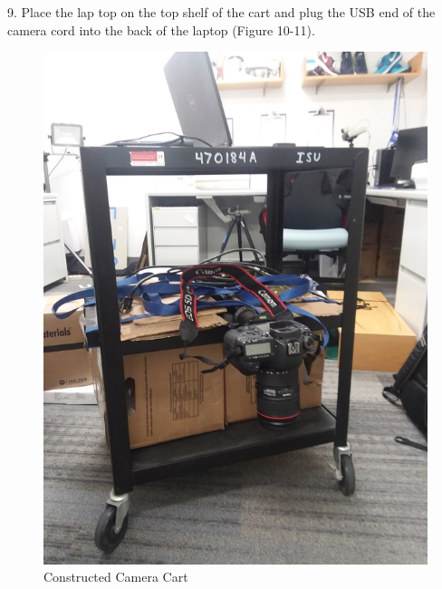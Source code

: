 9. Place the lap top on the top shelf of the cart and plug the USB end of the camera cord into the back of the laptop (Figure 10-11). 

\begin{figure}[!htp]
\centering
\includegraphics[scale=.2]{Cart1.png}
\caption{Constructed Camera Cart}
\label{Image 10}
\end{figure}

